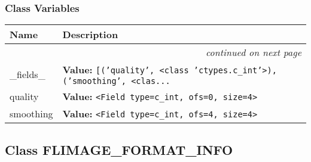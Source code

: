
  \subsubsection{Class Variables}

    \vspace{-1cm}
\hspace{\varindent}\begin{longtable}{|p{\varnamewidth}|p{\vardescrwidth}|l}
\cline{1-2}
\cline{1-2} \centering \textbf{Name} & \centering \textbf{Description}& \\
\cline{1-2}
\endhead\cline{1-2}\multicolumn{3}{r}{\small\textit{continued on next page}}\\\endfoot\cline{1-2}
\endlastfoot\raggedright \_\-f\-i\-e\-l\-d\-s\-\_\- & \raggedright \textbf{Value:} 
{\tt \texttt{[}\texttt{(}\texttt{'}\texttt{quality}\texttt{'}\texttt{, }{\textless}class 'ctypes.c\_int'{\textgreater}\texttt{)}\texttt{, }\texttt{(}\texttt{'}\texttt{smoothing}\texttt{'}\texttt{, }{\textless}clas\texttt{...}}&\\
\cline{1-2}
\raggedright q\-u\-a\-l\-i\-t\-y\- & \raggedright \textbf{Value:} 
{\tt {\textless}Field type=c\_int, ofs=0, size=4{\textgreater}}&\\
\cline{1-2}
\raggedright s\-m\-o\-o\-t\-h\-i\-n\-g\- & \raggedright \textbf{Value:} 
{\tt {\textless}Field type=c\_int, ofs=4, size=4{\textgreater}}&\\
\cline{1-2}
\end{longtable}



\subsection{Class FLIMAGE\_FORMAT\_INFO}

